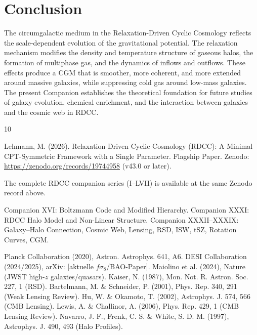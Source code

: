 \documentclass[11pt,a4paper]{article}
\begin{document}
\section{Conclusion}

The circumgalactic medium in the Relaxation-Driven Cyclic Cosmology reflects the 
scale-dependent evolution of the gravitational potential. The relaxation mechanism 
modifies the density and temperature structure of gaseous halos, the formation of 
multiphase gas, and the dynamics of inflows and outflows. These effects produce a 
CGM that is smoother, more coherent, and more extended around massive galaxies, 
while suppressing cold gas around low-mass galaxies. The present Companion 
establishes the theoretical foundation for future studies of galaxy evolution, 
chemical enrichment, and the interaction between galaxies and the cosmic web in 
RDCC.


\begin{thebibliography}{10}

 Lehmann, M. (2026). Relaxation-Driven Cyclic Cosmology (RDCC): A Minimal CPT-Symmetric Framework with a Single Parameter. Flagship Paper. Zenodo: \url{https://zenodo.org/records/19744958} (v43.0 or later).

 The complete RDCC companion series (I--LVII) is available at the same Zenodo record above.

 Companion XVI: Boltzmann Code and Modified Hierarchy.
 Companion XXXI: RDCC Halo Model and Non-Linear Structure.
 Companion XXXII--XXXIX: Galaxy--Halo Connection, Cosmic Web, Lensing, RSD, ISW, tSZ, Rotation Curves, CGM.

 Planck Collaboration (2020), Astron. Astrophys. 641, A6.
 DESI Collaboration (2024/2025), arXiv: [aktuelle $f\sigma_8$/BAO-Paper].
 Maiolino et al. (2024), Nature (JWST high-$z$ galaxies/quasars).
 Kaiser, N. (1987), Mon. Not. R. Astron. Soc. 227, 1 (RSD).
 Bartelmann, M. \& Schneider, P. (2001), Phys. Rep. 340, 291 (Weak Lensing Review).
 Hu, W. \& Okamoto, T. (2002), Astrophys. J. 574, 566 (CMB Lensing).
 Lewis, A. \& Challinor, A. (2006), Phys. Rep. 429, 1 (CMB Lensing Review).
 Navarro, J. F., Frenk, C. S. \& White, S. D. M. (1997), Astrophys. J. 490, 493 (Halo Profiles).

\end{thebibliography}
\end{document}
